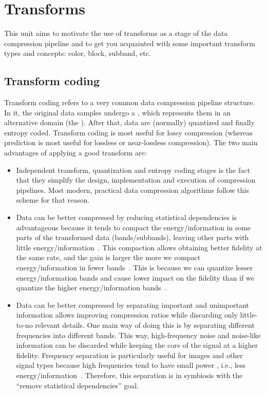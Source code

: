 \chapter{Transforms}\label{sec:transforms}

This unit aims to motivate the use of transforms as a stage of the data compression pipeline and to get you acquainted with some important transform types and concepts: color, block, subband, etc.

\section{Transform coding}

Transform coding refers to a very common data compression pipeline structure. In it, the original data samples undergo a
, which represents them in an alternative domain (the ). After that, data are (normally)
quantized and finally entropy coded. Transform coding is most useful for lossy compression (whereas prediction is most useful
for lossless or near-lossless compression). The two main advantages of applying a good transform are:

\begin{itemize}
	\item Independent transform, quantization and entropy coding stages is the fact that they simplify the design, implementation and execution of compression pipelines. Most modern, practical data compression algorithms follow this scheme for
that reason.
	\item Data can be better compressed by reducing statistical dependencies is advantageous because it tends to compact the energy/information in some parts of the transformed data (bands/subbands), leaving other parts with little energy/information~\cite[\S 4.3.1]{taubman2002jpeg2000}. This compaction allows obtaining better fidelity at the same rate, and the gain is larger the more we compact energy/information in fewer bands~\cite[\S 13.3, eq.~27]{sayood_introduction}\cite[p.~207]{taubman2002jpeg2000}. This is because we can quantize lesser energy/information bands and cause lower impact on the fidelity than if we quantize the higher energy/information bands~\cite[\S 13.3]{sayood_introduction}\cite["Principle Components and the KLT"]{taubman2002jpeg2000}.
	\item Data can be better compressed by separating important and unimportant information allows improving compression ratios while discarding only little-to-no relevant details. One main way of doing this is by separating different frequencies into different bands. This way, high-frequency noise and noise-like information can be discarded while keeping the core of the signal at
a higher fidelity. Frequency separation is particularly useful for images and other signal types because high frequencies tend to have small power , i.e., less energy/information~\cite[eq.~4.32]{taubman2002jpeg2000}. Therefore, this separation is in symbiosis with the “remove statistical dependencies” goal.
\end{itemize}

